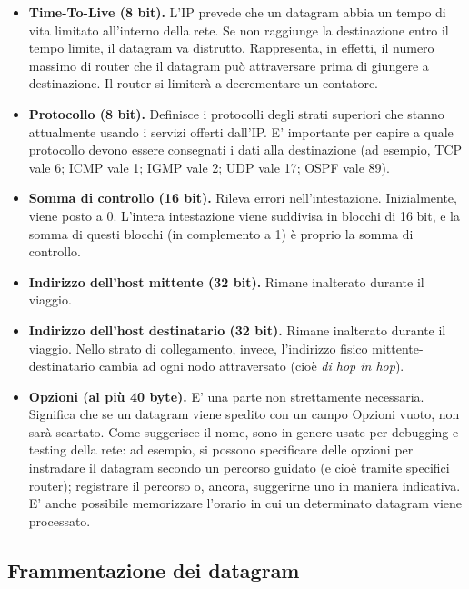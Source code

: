 \begin{itemize}
        \item 
            \textbf{Time-To-Live (8 bit).} L'IP prevede che un datagram abbia un tempo di vita limitato all'interno della rete. Se non raggiunge la destinazione entro il tempo limite, il datagram va distrutto. Rappresenta, in effetti, il numero massimo di router che il datagram può attraversare prima di giungere a destinazione. Il router si limiterà a decrementare un contatore.
            
        \item 
            \textbf{Protocollo (8 bit).} Definisce i protocolli degli strati superiori che stanno attualmente usando i servizi offerti dall'IP. E' importante per capire a quale protocollo devono essere consegnati i dati alla destinazione (ad esempio, TCP vale 6; ICMP vale 1; IGMP vale 2; UDP vale 17; OSPF vale 89).
            
        \item 
            \textbf{Somma di controllo (16 bit).} Rileva errori nell'intestazione. Inizialmente, viene posto a 0. L'intera intestazione viene suddivisa in blocchi di 16 bit, e la somma di questi blocchi (in complemento a 1) è proprio la somma di controllo.
            
        \item 
            \textbf{Indirizzo dell'host mittente (32 bit).} Rimane inalterato durante il viaggio.
            
        \item 
            \textbf{Indirizzo dell'host destinatario (32 bit).} Rimane inalterato durante il viaggio. Nello strato di collegamento, invece, l'indirizzo fisico mittente-destinatario cambia ad ogni nodo attraversato (cioè \textit{di hop in hop}).
            
        \item
            \textbf{Opzioni (al più 40 byte).} E' una parte non strettamente necessaria. Significa che se un datagram viene spedito con un campo Opzioni vuoto, non sarà scartato. Come suggerisce il nome, sono in genere usate per debugging e testing della rete: ad esempio, si possono specificare delle opzioni per instradare il datagram secondo un percorso guidato (e cioè tramite specifici router); registrare il percorso o, ancora, suggerirne uno in maniera indicativa. E' anche possibile memorizzare l'orario in cui un determinato datagram viene processato.
    \end{itemize}
    
    \subsection{Frammentazione dei datagram}
    
